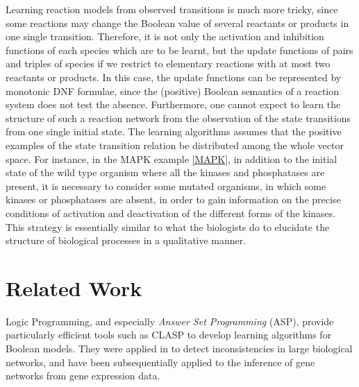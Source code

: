 \documentclass{llncs}
\begin{document}
  Learning reaction models from observed transitions is much more tricky,
  since some reactions may change the Boolean value of several reactants or products in one single transition.
  Therefore, it is not only the activation and inhibition functions of each species which are to be learnt,
  but the update functions of pairs and triples of species if we restrict to elementary reactions with at most two reactants or products.
  In this case, the update functions can be represented by monotonic DNF formulae, since the (positive) Boolean semantics of a reaction system does not test the absence. 
Furthermore,   one cannot expect to learn the structure of such a reaction network
from the observation of the state transitions from one single initial state.
The learning algorithms assumes that the positive examples of the state transition relation be distributed
among the whole vector space.
For instance, in the MAPK example \ref{MAPK}, in addition to the initial state of the wild type organism where all the kinases and phosphatases are present,
it is necessary to consider some mutated organisms, in which some kinases or phosphatases are absent,
in order to gain information on the precise conditions of activation and deactivation of the different forms of the kinases.
This strategy is essentially similar to what the biologists do to elucidate the structure of biological processes
in a qualitative manner.


\section{Related Work}

Logic Programming, and especially \emph{Answer Set Programming} (ASP), provide particularly efficient tools such as CLASP \cite{GKNS07lpnmr} to develop learning algorithms for Boolean models.
They were applied in \cite{GSTUV08iclp} to detect inconsistencies in large biological networks,
and have been subsequentially applied to the inference of gene networks from gene expression data.
\end{document}
